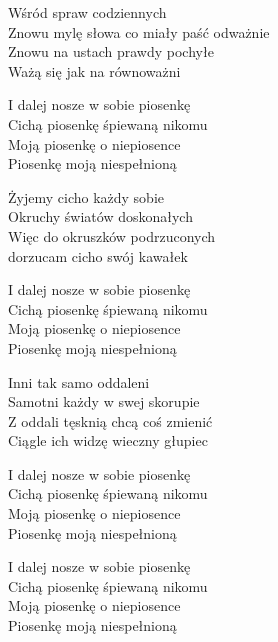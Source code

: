 \begin{text}
    Wśród spraw codziennych\\
    Znowu mylę słowa co miały paść odważnie\\
    Znowu na ustach prawdy pochyłe\\
    Ważą się jak na równoważni

    I dalej nosze w sobie piosenkę\\
    Cichą piosenkę śpiewaną nikomu\\
    Moją piosenkę o niepiosence\\
    Piosenkę moją niespełnioną

    Żyjemy cicho każdy sobie\\
    Okruchy światów doskonałych\\
    Więc do okruszków podrzuconych\\
    dorzucam cicho swój kawałek

    I dalej nosze w sobie piosenkę\\
    Cichą piosenkę śpiewaną nikomu\\
    Moją piosenkę o niepiosence\\
    Piosenkę moją niespełnioną

    Inni tak samo oddaleni\\
    Samotni każdy w swej skorupie\\
    Z oddali tęsknią chcą coś zmienić\\
    Ciągle ich widzę wieczny głupiec

    I dalej nosze w sobie piosenkę\\
    Cichą piosenkę śpiewaną nikomu\\
    Moją piosenkę o niepiosence\\
    Piosenkę moją niespełnioną

    I dalej nosze w sobie piosenkę\\
    Cichą piosenkę śpiewaną nikomu\\
    Moją piosenkę o niepiosence\\
    Piosenkę moją niespełnioną
\end{text}
\begin{chord}

\end{chord}